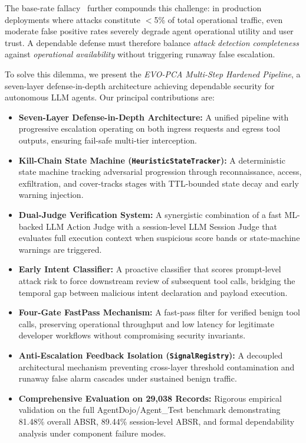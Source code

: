 \documentclass[conference]{IEEEtran}
\begin{document}
The base-rate fallacy~\cite{axelsson2000base} further compounds this challenge: in production deployments where attacks constitute $<$5\% of total operational traffic, even moderate false positive rates severely degrade agent operational utility and user trust. A dependable defense must therefore balance \textit{attack detection completeness} against \textit{operational availability} without triggering runaway false escalation.

To solve this dilemma, we present the \textit{EVO-PCA Multi-Step Hardened Pipeline}, a seven-layer defense-in-depth architecture achieving dependable security for autonomous LLM agents. Our principal contributions are:

\begin{itemize}[leftmargin=*]
    \item \textbf{Seven-Layer Defense-in-Depth Architecture:} A unified pipeline with progressive escalation operating on both ingress requests and egress tool outputs, ensuring fail-safe multi-tier interception.
    \item \textbf{Kill-Chain State Machine (\texttt{HeuristicStateTracker}):} A deterministic state machine tracking adversarial progression through reconnaissance, access, exfiltration, and cover-tracks stages with TTL-bounded state decay and early warning injection.
    \item \textbf{Dual-Judge Verification System:} A synergistic combination of a fast ML-backed LLM Action Judge with a session-level LLM Session Judge that evaluates full execution context when suspicious score bands or state-machine warnings are triggered.
    \item \textbf{Early Intent Classifier:} A proactive classifier that scores prompt-level attack risk to force downstream review of subsequent tool calls, bridging the temporal gap between malicious intent declaration and payload execution.
    \item \textbf{Four-Gate FastPass Mechanism:} A fast-pass filter for verified benign tool calls, preserving operational throughput and low latency for legitimate developer workflows without compromising security invariants.
    \item \textbf{Anti-Escalation Feedback Isolation (\texttt{SignalRegistry}):} A decoupled architectural mechanism preventing cross-layer threshold contamination and runaway false alarm cascades under sustained benign traffic.
    \item \textbf{Comprehensive Evaluation on 29,038 Records:} Rigorous empirical validation on the full AgentDojo/Agent\_Test benchmark demonstrating 81.48\% overall ABSR, 89.44\% session-level ABSR, and formal dependability analysis under component failure modes.
\end{itemize}
\end{document}
